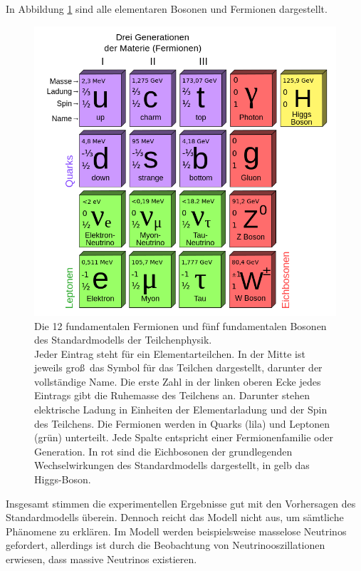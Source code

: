 In Abbildung \ref{fig:Standardmodell} sind alle elementaren Bosonen und Fermionen dargestellt.

\begin{figure}[tbp]
 \begin{center}
   \includegraphics[width=\textwidth]{graphics/Standard_Model.png}
   \parbox[b]{12cm}{
     \caption[Standardmodell der Teilchenphysik]
             {\label{fig:Standardmodell}Die 12 fundamentalen Fermionen und f\"unf fundamentalen Bosonen des Standardmodells der Teilchenphysik.\\Jeder Eintrag steht f\"ur ein Elementarteilchen. In der Mitte ist jeweils gro\ss~das Symbol f\"ur das Teilchen dargestellt, darunter der vollst\"andige Name. Die erste Zahl in der linken oberen Ecke jedes Eintrags gibt die Ruhemasse des Teilchens an. Darunter stehen elektrische Ladung in Einheiten der Elementarladung und der Spin des Teilchens. Die Fermionen werden in Quarks (lila) und Leptonen (gr\"un) unterteilt. Jede Spalte entspricht einer Fermionenfamilie oder Generation. In rot sind die Eichbosonen der grundlegenden Wechselwirkungen des Standardmodells dargestellt, in gelb das Higgs-Boson. \cite{wiki:Standardmodell}}
   }
 \end{center}
\end{figure}

Insgesamt stimmen die experimentellen Ergebnisse gut mit den Vorhersagen des Standardmodells \"uberein. Dennoch reicht das Modell nicht aus, um s\"amtliche Ph\"anomene zu erkl\"aren. Im Modell werden beispielsweise masselose Neutrinos gefordert, allerdings ist durch die Beobachtung von Neutrinooszillationen erwiesen, dass massive Neutrinos existieren.

